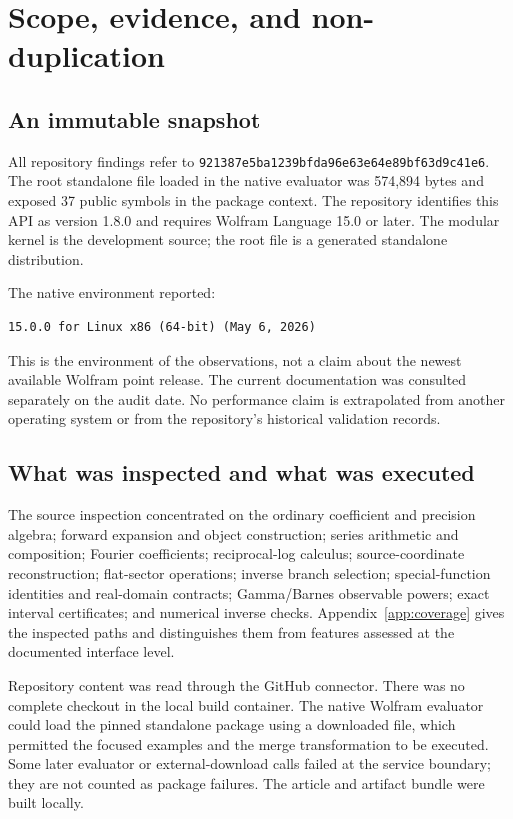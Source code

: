 \documentclass[11pt,letterpaper]{article}
\newcommand{\commit}{\texttt{921387e5ba1239bfda96e63e64e89bf63d9c41e6}}
\begin{document}
\clearpage
\begingroup\small\setlength{\parskip}{0pt}\tableofcontents\endgroup
\clearpage

\section{Scope, evidence, and non-duplication}
\subsection{An immutable snapshot}
All repository findings refer to \commit. The root standalone file loaded in the native evaluator was 574,894 bytes and exposed 37 public symbols in the package context. The repository identifies this API as version 1.8.0 and requires Wolfram Language 15.0 or later. The modular kernel is the development source; the root file is a generated standalone distribution.\cite{readme,core}

The native environment reported:
\begin{lstlisting}
15.0.0 for Linux x86 (64-bit) (May 6, 2026)
\end{lstlisting}
This is the environment of the observations, not a claim about the newest available Wolfram point release. The current documentation was consulted separately on the audit date. No performance claim is extrapolated from another operating system or from the repository's historical validation records.

\subsection{What was inspected and what was executed}
The source inspection concentrated on the ordinary coefficient and precision algebra; forward expansion and object construction; series arithmetic and composition; Fourier coefficients; reciprocal-log calculus; source-coordinate reconstruction; flat-sector operations; inverse branch selection; special-function identities and real-domain contracts; Gamma/Barnes observable powers; exact interval certificates; and numerical inverse checks. Appendix~\ref{app:coverage} gives the inspected paths and distinguishes them from features assessed at the documented interface level.

Repository content was read through the GitHub connector. There was no complete checkout in the local build container. The native Wolfram evaluator could load the pinned standalone package using a downloaded file, which permitted the focused examples and the merge transformation to be executed. Some later evaluator or external-download calls failed at the service boundary; they are not counted as package failures. The article and artifact bundle were built locally.
\end{document}
